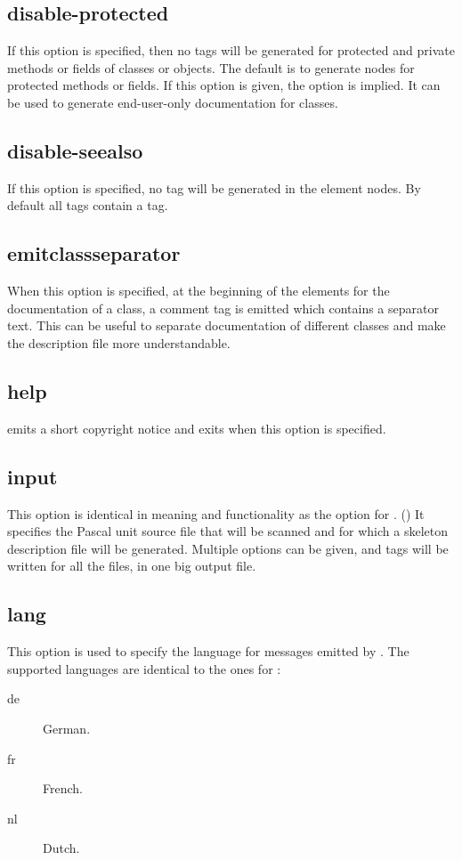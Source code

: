\subsection{disable-protected}
\label{suse:disableprotected}
If this option is specified, then no  tags will be generated
for protected and private methods or fields of classes or objects. 
The default is to generate nodes for protected methods or fields. If this
option is given, the option  is implied. It can be
used to generate end-user-only documentation for classes. 


\subsection{disable-seealso}
\label{suse:msdisableseealso}
If this option is specified, no  tag will be generated in the
element nodes. By default all  tags contain a  tag.


\subsection{emitclassseparator}
\label{suse:msemitclassseparator}
When this option is specified, at the beginning of the elements for the
documentation of a class, a comment tag is emitted which contains a
separator text. This can be useful to separate documentation of different
classes and make the description file more understandable.

\subsection{help}
\label{suse:mshelp}
 emits a short copyright notice and exits when this option is
specified.

\subsection{input}
\label{suse:msinput}
This option is identical in meaning and functionality as the 
option for \fpdoc. () It specifies the Pascal unit source 
file that will be scanned and for which a skeleton description file will be
generated. Multiple  options can be given, and 
tags will be written for all the files, in one big output file.

\subsection{lang}
\label{suse:mslang}
This option is used to specify the language for messages emitted by
. The supported languages are identical to the ones 
for \fpdoc:
\begin{description}
\item[de] German.
\item[fr] French.
\item[nl] Dutch.
\end{description}

